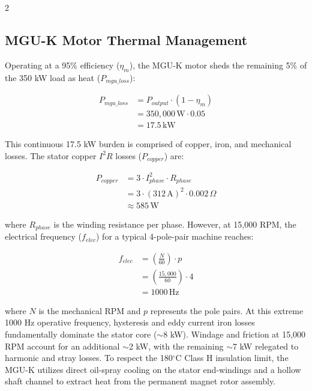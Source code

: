 \begin{multicols}{2}
\subsection{MGU-K Motor Thermal Management}

Operating at a 95\% efficiency ($\eta_m$), the MGU-K motor sheds the remaining 5\% of the 350 kW load as heat ($P_{mgu\_loss}$):

\begin{equation} \label{eq:mgu_loss}
\begin{split}
P_{mgu\_loss} &= P_{output} \cdot (1 - \eta_m) \\
&= 350,000\,\mathrm{W} \cdot 0.05 \\
&= 17.5\,\mathrm{kW}
\end{split}
\end{equation}

This continuous 17.5 kW burden is comprised of copper, iron, and mechanical losses. The stator copper $I^2R$ losses ($P_{copper}$) are:

\begin{equation} \label{eq:mgu_copper_loss}
\begin{split}
P_{copper} &= 3 \cdot I^2_{phase} \cdot R_{phase} \\
&= 3 \cdot (312\,\mathrm{A})^2 \cdot 0.002\,\Omega \\
&\approx 585\,\mathrm{W}
\end{split}
\end{equation}

where $R_{phase}$ is the winding resistance per phase. However, at 15,000 RPM, the electrical frequency ($f_{elec}$) for a typical 4-pole-pair machine reaches:

\begin{equation} \label{eq:electrical_freq}
\begin{split}
f_{elec} &= \left( \frac{N}{60} \right) \cdot p \\
&= \left( \frac{15,000}{60} \right) \cdot 4 \\
&= 1000\,\mathrm{Hz}
\end{split}
\end{equation}

where $N$ is the mechanical RPM and $p$ represents the pole pairs. At this extreme 1000 Hz operative frequency, hysteresis and eddy current iron losses fundamentally dominate the stator core ($\sim$8 kW). Windage and friction at 15,000 RPM account for an additional $\sim$2 kW, with the remaining $\sim$7 kW relegated to harmonic and stray losses. To respect the 180$^\circ$C Class H insulation limit, the MGU-K utilizes direct oil-spray cooling on the stator end-windings and a hollow shaft channel to extract heat from the permanent magnet rotor assembly.


\end{multicols}
